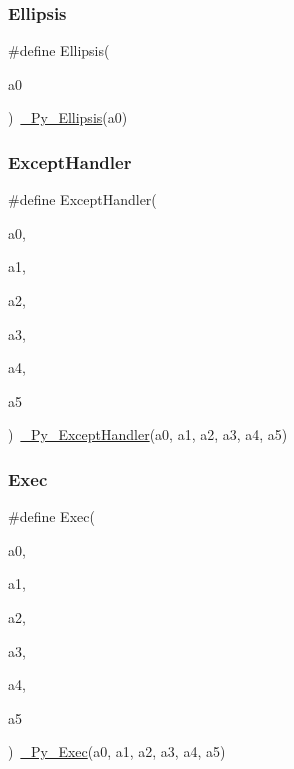 \mbox{\label{_python-ast_8h_aca68c3beeed802b96603f6613db5d786}} 
\subsubsection{\texorpdfstring{Ellipsis}{Ellipsis}}
{\footnotesize\ttfamily \#define Ellipsis(\begin{DoxyParamCaption}\item[{}]{a0 }\end{DoxyParamCaption})~\mbox{\hyperlink{_python-ast_8h_ad6c8822f22b05c0bf9c10f9952f9fd88}{\+\_\+\+Py\+\_\+\+Ellipsis}}(a0)}

\mbox{\label{_python-ast_8h_af2aadb28141fc0df670e4eb65b8b7dfe}} 
\subsubsection{\texorpdfstring{ExceptHandler}{ExceptHandler}}
{\footnotesize\ttfamily \#define Except\+Handler(\begin{DoxyParamCaption}\item[{}]{a0,  }\item[{}]{a1,  }\item[{}]{a2,  }\item[{}]{a3,  }\item[{}]{a4,  }\item[{}]{a5 }\end{DoxyParamCaption})~\mbox{\hyperlink{_python-ast_8h_a94b7d40f34ae3efcca7c06be95124922}{\+\_\+\+Py\+\_\+\+Except\+Handler}}(a0, a1, a2, a3, a4, a5)}

\mbox{\label{_python-ast_8h_a306e50f881257e70fcc045f9021b23be}} 
\subsubsection{\texorpdfstring{Exec}{Exec}}
{\footnotesize\ttfamily \#define Exec(\begin{DoxyParamCaption}\item[{}]{a0,  }\item[{}]{a1,  }\item[{}]{a2,  }\item[{}]{a3,  }\item[{}]{a4,  }\item[{}]{a5 }\end{DoxyParamCaption})~\mbox{\hyperlink{_python-ast_8h_a99ce3e6b27859f459d9b50528048e693}{\+\_\+\+Py\+\_\+\+Exec}}(a0, a1, a2, a3, a4, a5)}

